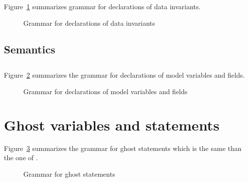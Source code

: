 \nodiff

Figure~\ref{fig:gram:datainvariants} summarizes grammar for declarations of data
invariants.
\begin{figure}[htbp]
  \caption{Grammar for declarations of data invariants}
\label{fig:gram:datainvariants}
\end{figure}



\subsection{Semantics}
\nodiff


\subsection{}
\label{sec:model}

\nodiff

Figure~\ref{fig:gram:model} summarizes the grammar for declarations of model
variables and fields.
\begin{figure}[htbp]
  \caption{Grammar for declarations of model variables and fields}
\label{fig:gram:model}
\end{figure}


\section{Ghost variables and statements}
\label{sec:ghost}

\nodiff

Figure~\ref{fig:gram:ghost} summarizes the grammar for ghost statements which is
the same than the one of \acsl.
\begin{figure}[htbp]
  \caption{Grammar for ghost statements}
\label{fig:gram:ghost}
\end{figure}


